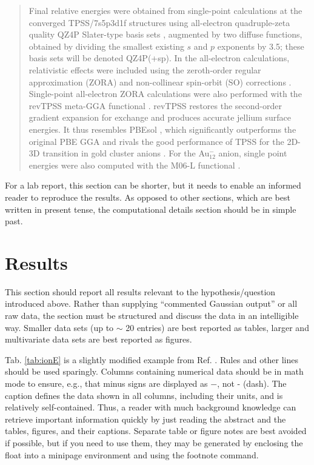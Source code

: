 \documentclass[11pt]{article}
\begin{document}
\begin{quote}
Final relative energies were obtained from single-point calculations at the
converged TPSS/7s5p3d1f structures using all-electron quadruple-zeta quality
QZ4P Slater-type basis sets \cite{vanLenthe.E:JCC.2003}, augmented by two
diffuse functions, obtained by dividing the smallest existing $s$ and $p$
exponents by 3.5; these basis sets will be denoted QZ4P(+sp). In the
all-electron calculations, relativistic effects were included using
the zeroth-order regular approximation (ZORA) \cite{Chang.C:PS.1986,
  vanLenthe:JCP.1993} and non-collinear spin-orbit (SO) corrections
\cite{Eschrig.H:JCC.1999}. Single-point all-electron ZORA calculations were
also performed with the revTPSS meta-GGA functional \cite{Perdew.J:PRL.2009}.
revTPSS restores the second-order gradient expansion for exchange and
produces accurate jellium surface energies. It thus resembles PBEsol
\cite{Perdew.J:PRL.2008}, which significantly outperforms the original PBE
GGA \cite{Perdew.J:PRL.1996} and rivals the good performance of TPSS for the
2D-3D transition in gold cluster anions \cite{Johansson.M:PRA.2008,
Johansson.M:JPCC.2008}. For the Au$_{12}^-$ anion, single point energies were
also computed with the M06-L functional \cite{M06-L}.

\end{quote}

For a lab report, this section can be shorter, but it needs to enable
an informed reader to reproduce the results. As opposed to other
sections, which are best written in present tense, the computational
details section should be in simple past.

\section{Results}

This section should report all results relevant to the
hypothesis/question introduced above. Rather than supplying ``commented
Gaussian output'' or all raw data, the section must be structured and
discuss the data in an intelligible way. Smaller data sets (up to $\sim$ 20
entries) are best reported as tables, larger and multivariate data sets
are best reported as figures. 

Tab. \ref{tab:ionE} is a slightly modified example from
Ref. \cite{Johannson14JPhysChemC118p29370}. Rules and other lines should be used
sparingly. Columns containing numerical data should be in math mode to
ensure, e.g., that minus signs are displayed as $-$, not - (dash). The
caption defines the data shown in all 
columns, including their units, and is relatively self-contained. Thus,
a reader with much background knowledge can retrieve important
information quickly by just reading the abstract and the tables,
figures, and their captions. Separate table or figure notes are best
avoided if possible, but if you need to use them, they may be generated
by enclosing the float into a minipage environment and using the
footnote command.
\end{document}
